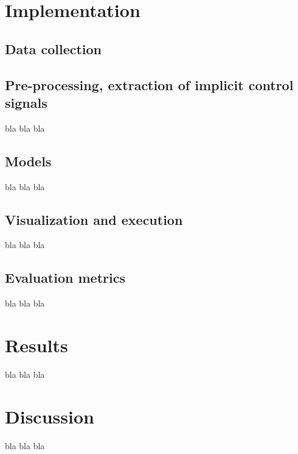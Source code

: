 \documentclass{article}
\begin{document}
\section{Implementation}
\label{sec:materials}


\subsection{Data collection}
\label{sec:collection}



\subsection{Pre-processing, extraction of implicit control signals}
\label{sec:preprocess}

bla bla bla

\subsection{Models}
\label{sec:models}

bla bla bla

\subsection{Visualization and execution}
\label{sec:exec}


bla bla bla

\subsection{Evaluation metrics}
\label{sec:eval}

bla bla bla


\section{Results}

bla bla bla


\section{Discussion}

bla bla bla





\end{document}
